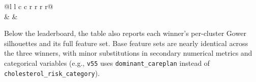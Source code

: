 \begin{table}[H]
\begin{tabular}{@{}l l c c r r r r@{}}
 \\
 &
 &
 \\
\bottomrule
\end{tabular}
\caption{Composite-score leaderboard and the three winning configurations.}
\label{tab:ch6_per_k_winners}
\end{table}

Below the leaderboard, the table also reports each winner's per-cluster Gower silhouettes and its full feature set. Base feature sets are nearly identical across the three winners, with minor substitutions in secondary numerical metrics and categorical variables (e.g., \texttt{v55} uses \texttt{dominant\_careplan} instead of \texttt{cholesterol\_risk\_category}).

